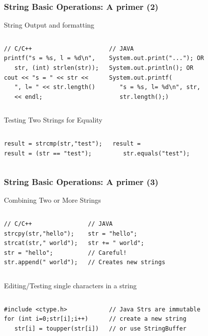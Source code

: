 \documentclass{beamer}
\begin{document}
\begin{frame}[fragile]
  \frametitle{String Basic Operations: A primer (2)}
  {\smaller
    \begin{block}{String Output and formatting}
      \begin{columns}[T]
\begin{verbatim}
// C/C++
printf("s = %s, l = %d\n",
   str, (int) strlen(str));
cout << "s = " << str <<
   ", l= " << str.length()
   << endl;
\end{verbatim}
\begin{verbatim}
// JAVA
System.out.print("..."); OR
System.out.println(); OR
System.out.printf(
   "s = %s, l= %d\n", str,
   str.length();)
\end{verbatim}
      \end{columns}
    \end{block}
    \begin{block}{Testing Two Strings for Equality}
      \begin{columns}[T]
\begin{verbatim}
result = strcmp(str,"test");
result = (str == "test");
\end{verbatim}
\begin{verbatim}
result =
   str.equals("test");

\end{verbatim}
      \end{columns}
    \end{block}
  }
\end{frame}

\begin{frame}[fragile]
  \frametitle{String Basic Operations: A primer (3)}
  {\smaller
    \begin{block}{Combining Two or More Strings}
      \begin{columns}[T]
\begin{verbatim}
// C/C++
strcpy(str,"hello");
strcat(str," world");
str = "hello";
str.append(" world");
\end{verbatim}
\begin{verbatim}
// JAVA
str = "hello";
str += " world";
// Careful!
// Creates new strings
\end{verbatim}
      \end{columns}
    \end{block}
    \begin{block}{Editing/Testing single characters in a string}
      \begin{columns}[T]
\begin{verbatim}
#include <ctype.h>
for (int i=0;str[i];i++)
   str[i] = toupper(str[i])
\end{verbatim}
\begin{verbatim}
// Java Strs are immutable
// create a new string
// or use StringBuffer
\end{verbatim}
      \end{columns}
    \end{block}
  }
\end{frame}
\end{document}
